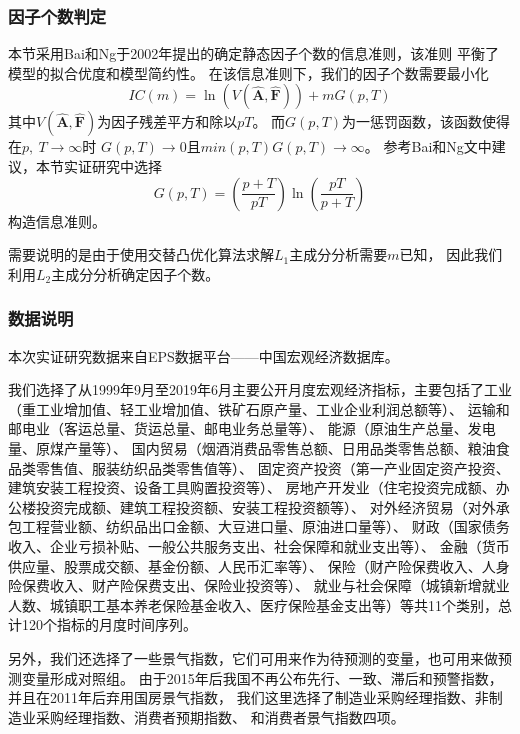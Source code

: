 \subsubsection{因子个数判定}
本节采用Bai和Ng于2002年提出的确定静态因子个数的信息准则\cite{bai2002determining}，该准则
平衡了模型的拟合优度和模型简约性。
在该信息准则下，我们的因子个数需要最小化
\begin{equation}\label{number}
    IC(m) = \ln(V(\hat{\bm{A}}, \hat{\bm{F}})) + mG(p, T)
\end{equation}
其中$V(\hat{\bm{A}}, \hat{\bm{F}})$为因子残差平方和除以$pT$。
而$G(p,T)$为一惩罚函数，该函数使得在$p,\ T \rightarrow \infty$时
$G(p, T) \rightarrow 0$且$min(p, T)G(p,T) \rightarrow \infty$。
参考Bai和Ng文中建议，本节实证研究中选择
$$
    G(p, T) = (\frac{p + T}{pT})\ln(\frac{pT}{p + T})
$$
构造信息准则。

需要说明的是由于使用交替凸优化算法求解$L_1$主成分分析需要$m$已知，
因此我们利用$L_2$主成分分析确定因子个数。

\subsubsection{数据说明}
本次实证研究数据来自EPS数据平台——中国宏观经济数据库。

我们选择了从1999年9月至2019年6月主要公开月度宏观经济指标，主要包括了工业（重工业增加值、轻工业增加值、铁矿石原产量、工业企业利润总额等）、
运输和邮电业（客运总量、货运总量、邮电业务总量等）、
能源（原油生产总量、发电量、原煤产量等）、
国内贸易（烟酒消费品零售总额、日用品类零售总额、粮油食品类零售值、服装纺织品类零售值等）、
固定资产投资（第一产业固定资产投资、建筑安装工程投资、设备工具购置投资等）、
房地产开发业（住宅投资完成额、办公楼投资完成额、建筑工程投资额、安装工程投资额等）、
对外经济贸易（对外承包工程营业额、纺织品出口金额、大豆进口量、原油进口量等）、
财政（国家债务收入、企业亏损补贴、一般公共服务支出、社会保障和就业支出等）、
金融（货币供应量、股票成交额、基金份额、人民币汇率等）、
保险（财产险保费收入、人身险保费收入、财产险保费支出、保险业投资等）、
就业与社会保障（城镇新增就业人数、城镇职工基本养老保险基金收入、医疗保险基金支出等）等共11个类别，总计120个指标的月度时间序列。

另外，我们还选择了一些景气指数，它们可用来作为待预测的变量，也可用来做预测变量形成对照组。
由于2015年后我国不再公布先行、一致、滞后和预警指数，并且在2011年后弃用国房景气指数，
我们这里选择了制造业采购经理指数、非制造业采购经理指数、消费者预期指数、
和消费者景气指数四项。

